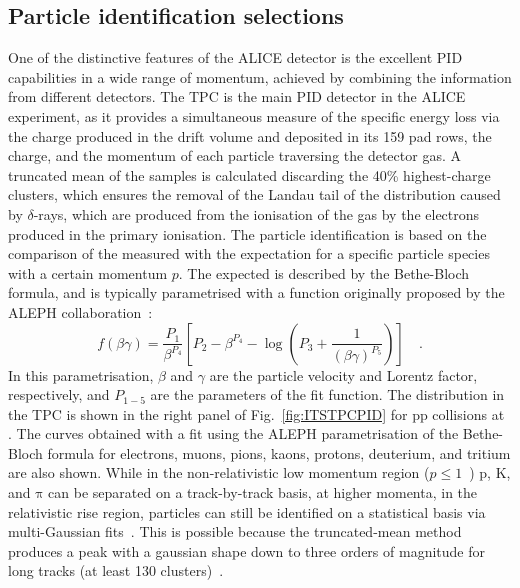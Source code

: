 \subsection{Particle identification selections}\label{sec:PIDselections}
One of the distinctive features of the ALICE detector is the excellent PID capabilities in a wide range of momentum, achieved by combining the information from different detectors. 
The TPC is the main PID detector in the ALICE experiment, as it provides a simultaneous measure of the specific energy loss via the charge produced in the drift volume and deposited in its 159 pad rows, the charge, and the momentum of each particle traversing the detector gas. A truncated mean of the \dedx samples is calculated discarding the 40\% highest-charge clusters, which ensures the removal of the Landau tail of the \dedx distribution caused by $\delta$-rays, which are produced from the ionisation of the gas by the electrons produced in the primary ionisation. The particle identification is based on the comparison of the measured \dedx with the expectation for a specific particle species with a certain momentum $p$. The expected \dedx is described by the Bethe-Bloch formula, and is typically parametrised with a function originally proposed by the ALEPH collaboration~\cite{Blum:2008nqe}:
\begin{equation*}
    f(\beta\gamma) = \frac{P_1}{\beta^{P_4}}\left[P_2 - \beta^{P_4} - \log\left(P_3 + \frac{1}{(\beta\gamma)^{P_5}}\right)\right]\quad .
\end{equation*}
In this parametrisation, $\beta$ and $\gamma$ are the particle velocity and Lorentz factor, respectively, and $P_{1-5}$ are the parameters of the fit function. The \dedx distribution in the TPC is shown in the right panel of Fig.~\ref{fig:ITSTPCPID} for pp collisions at \thirteen. The curves obtained with a fit using the ALEPH parametrisation of the Bethe-Bloch formula for electrons, muons, pions, kaons, protons, deuterium, and tritium are also shown. While in the non-relativistic low momentum region ($p \leq 1$~\gevc) p, K, and $\mathrm{\pi}$ can be separated on a track-by-track basis, at higher momenta, in the relativistic rise region, particles can still be identified on a statistical basis via multi-Gaussian fits~\cite{ALICE:2014sbx}. This is possible because the truncated-mean method produces a \dedx peak with a gaussian shape down to three orders of magnitude for long tracks (at least 130 clusters)~\cite{ALICE:2014sbx}.
